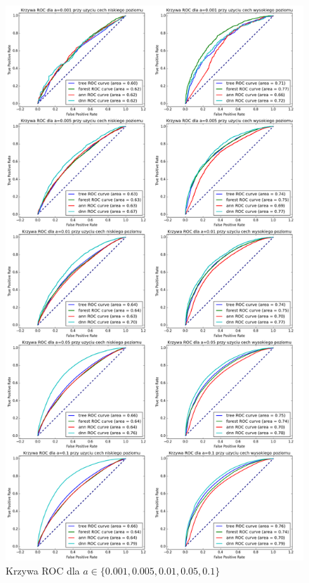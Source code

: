 \begin{figure}[ht!]
\centering
\includegraphics[scale=0.3]{res/all1.png}
\caption[Caption for LOF]{Krzywa ROC dla $a\in\{0.001, 0.005, 0.01, 0.05, 0.1\}$\label{higgsall1}}
\end{figure} 

